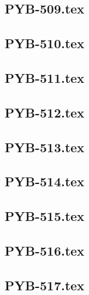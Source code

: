 \renewcommand{\xxexo}{PYB-509.tex} 
\subsection*{\xxexo} 
\graphicspath{{../../exos/python_bases/PYB-509/}}
 
 
\renewcommand{\xxexo}{PYB-510.tex} 
\subsection*{\xxexo} 
\graphicspath{{../../exos/python_bases/PYB-510/}}
 
 
\renewcommand{\xxexo}{PYB-511.tex} 
\subsection*{\xxexo} 
\graphicspath{{../../exos/python_bases/PYB-511/}}
 
 
\renewcommand{\xxexo}{PYB-512.tex} 
\subsection*{\xxexo} 
\graphicspath{{../../exos/python_bases/PYB-512/}}
 
 
\renewcommand{\xxexo}{PYB-513.tex} 
\subsection*{\xxexo} 
\graphicspath{{../../exos/python_bases/PYB-513/}}
 
 
\renewcommand{\xxexo}{PYB-514.tex} 
\subsection*{\xxexo} 
\graphicspath{{../../exos/python_bases/PYB-514/}}
 
 
\renewcommand{\xxexo}{PYB-515.tex} 
\subsection*{\xxexo} 
\graphicspath{{../../exos/python_bases/PYB-515/}}
 
 
\renewcommand{\xxexo}{PYB-516.tex} 
\subsection*{\xxexo} 
\graphicspath{{../../exos/python_bases/PYB-516/}}
 
 
\renewcommand{\xxexo}{PYB-517.tex} 
\subsection*{\xxexo} 
\graphicspath{{../../exos/python_bases/PYB-517/}}
 
